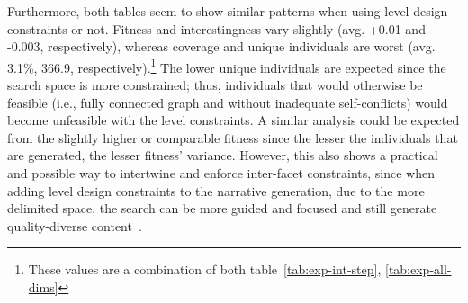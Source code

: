 Furthermore, both tables seem to show similar patterns when using level design constraints or not. Fitness and interestingness vary slightly (avg. +0.01 and -0.003, respectively), whereas coverage and unique individuals are worst (avg. 3.1\%, 366.9, respectively).\footnote{These values are a combination of both table~\ref{tab:exp-int-step}, \ref{tab:exp-all-dims}} The lower unique individuals are expected since the search space is more constrained; thus, individuals that would otherwise be feasible (i.e., fully connected graph and without inadequate self-conflicts) would become unfeasible with the level constraints. A similar analysis could be expected from the slightly higher or comparable fitness since the lesser the individuals that are generated, the lesser fitness' variance. However, this also shows a practical and possible way to intertwine and enforce inter-facet constraints, since when adding level design constraints to the narrative generation, due to the more delimited space, the search can be more guided and focused and still generate quality-diverse content~. 


